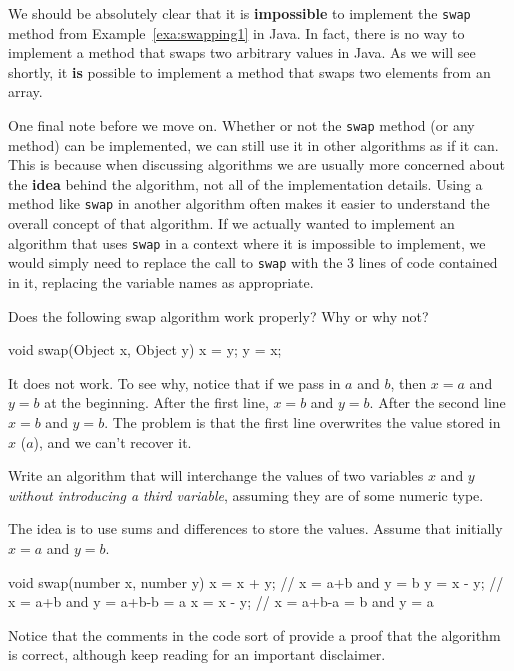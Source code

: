 \begin{rem}
We should be absolutely clear that it is {\bf impossible} 
to implement the \verb+swap+ method from Example~\ref{exa:swapping1} in Java.
In fact, there is no way to implement a method that swaps two arbitrary values in Java.
As we will see shortly, it {\bf is} possible to implement a method that swaps two elements from an array.
\end{rem}

\begin{rem}
One final note before we move on. Whether or not the \verb+swap+ method (or any method) 
can be implemented,
we can still use it in other algorithms as if it can.  This is because when discussing algorithms we are
usually more concerned about the {\bf idea} behind the algorithm, not all of the implementation details.
Using a method like \verb+swap+ in another algorithm often makes it easier to understand the overall
concept of that algorithm.  If we actually wanted to implement an algorithm that uses \verb+swap+ in a context where it is
impossible to implement, 
we would simply need to replace the call to \verb+swap+ with 
the 3 lines of code contained in it, replacing the variable names
as appropriate.
\end{rem}

\begin{ques}
Does the following swap algorithm work properly?  Why or why not?
\begin{code}
void swap(Object x, Object y) {
    x = y;
    y = x;
}
\end{code}
\answerlinetwo
\begin{answer}
It does not work.  To see why,
notice that if we pass in $a$ and $b$, then $x=a$ and $y=b$ at the beginning.
After the first line, $x=b$ and $y=b$. 
After the second line $x=b$ and $y=b$.  
The problem is that the first line overwrites the value stored in $x$ ($a$), and we can't recover it.
\end{answer}
\end{ques}

\begin{exa}\label{exa:swapnothird}
Write an algorithm that will interchange the values of two
variables $x$ and $y$ {\em without introducing a third variable}, assuming they are of some
numeric type.

\begin{sol}
The idea is to use sums and differences to store the
values. Assume that initially $x=a$ and $y = b$.
\begin{code}
  void swap(number x, number y) {
      x = x + y;  // x = a+b        and  y = b
      y = x - y;  // x = a+b        and  y = a+b-b = a  
      x = x - y;  // x = a+b-a = b  and  y = a
  }
\end{code}
Notice that the comments in the code sort of provide a proof that the algorithm is correct,
although keep reading for an important disclaimer.
\end{sol}
\end{exa}


